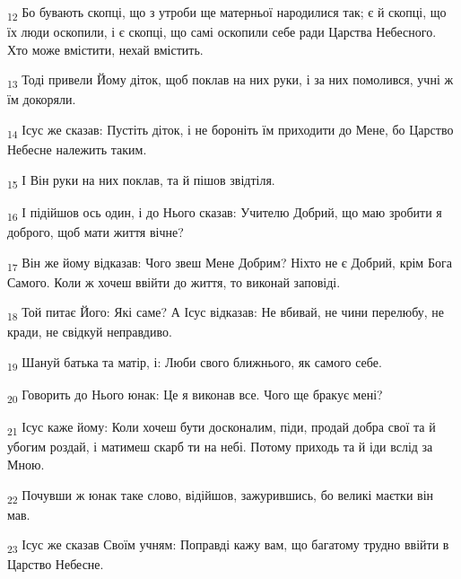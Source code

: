 \begin{tcolorbox}
\textsubscript{12} Бо бувають скопці, що з утроби ще матерньої народилися так; є й скопці, що їх люди оскопили, і є скопці, що самі оскопили себе ради Царства Небесного. Хто може вмістити, нехай вмістить.
\end{tcolorbox}
\begin{tcolorbox}
\textsubscript{13} Тоді привели Йому діток, щоб поклав на них руки, і за них помолився, учні ж їм докоряли.
\end{tcolorbox}
\begin{tcolorbox}
\textsubscript{14} Ісус же сказав: Пустіть діток, і не бороніть їм приходити до Мене, бо Царство Небесне належить таким.
\end{tcolorbox}
\begin{tcolorbox}
\textsubscript{15} І Він руки на них поклав, та й пішов звідтіля.
\end{tcolorbox}
\begin{tcolorbox}
\textsubscript{16} І підійшов ось один, і до Нього сказав: Учителю Добрий, що маю зробити я доброго, щоб мати життя вічне?
\end{tcolorbox}
\begin{tcolorbox}
\textsubscript{17} Він же йому відказав: Чого звеш Мене Добрим? Ніхто не є Добрий, крім Бога Самого. Коли ж хочеш ввійти до життя, то виконай заповіді.
\end{tcolorbox}
\begin{tcolorbox}
\textsubscript{18} Той питає Його: Які саме? А Ісус відказав: Не вбивай, не чини перелюбу, не кради, не свідкуй неправдиво.
\end{tcolorbox}
\begin{tcolorbox}
\textsubscript{19} Шануй батька та матір, і: Люби свого ближнього, як самого себе.
\end{tcolorbox}
\begin{tcolorbox}
\textsubscript{20} Говорить до Нього юнак: Це я виконав все. Чого ще бракує мені?
\end{tcolorbox}
\begin{tcolorbox}
\textsubscript{21} Ісус каже йому: Коли хочеш бути досконалим, піди, продай добра свої та й убогим роздай, і матимеш скарб ти на небі. Потому приходь та й іди вслід за Мною.
\end{tcolorbox}
\begin{tcolorbox}
\textsubscript{22} Почувши ж юнак таке слово, відійшов, зажурившись, бо великі маєтки він мав.
\end{tcolorbox}
\begin{tcolorbox}
\textsubscript{23} Ісус же сказав Своїм учням: Поправді кажу вам, що багатому трудно ввійти в Царство Небесне.
\end{tcolorbox}
